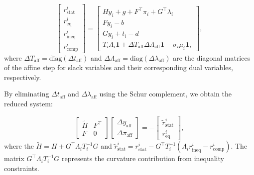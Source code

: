 \documentclass[conference]{IEEEtran}
\begin{document}
\begin{equation}
        \begin{bmatrix}
		r_{\mathrm{stat}}^i \\
		r_{\mathrm{eq}}^i \\
		r_{\mathrm{ineq}}^i \\
		r_{\mathrm{comp}}^i
		\end{bmatrix}
        =
		\begin{bmatrix}
            Hy_i + g + F^\top \pi_i + G^\top \lambda_i \\
            Fy_i - b \\
            Gy_i + t_i - d \\
            T_i \Lambda_i \mathbf{1} + \Delta T_\text{aff} \Delta \Lambda_\text{aff} \mathbf{1}  - \sigma_i \mu_i \mathbf{1},
        \end{bmatrix},
\end{equation}
where $\Delta T_\text{aff} = \mathrm{diag}(\Delta t_\text{aff})$ and $\Delta \Lambda_\text{aff} = \mathrm{diag}(\Delta \lambda_\text{aff})$ are the diagonal matrices of the affine step for slack variables and their corresponding dual variables, respectively.


By eliminating $\Delta t_\text{aff}$ and $\Delta \lambda_\text{aff}$ using the Schur complement, we obtain the reduced system:

\begin{equation}
    \begin{bmatrix}
    \tilde{H} & F^\top \\
    F & 0
    \end{bmatrix}
    \begin{bmatrix}
    \Delta y_\text{aff} \\
    \Delta \pi_\text{aff}
    \end{bmatrix} = -
    \begin{bmatrix}
    \tilde{r}_{\mathrm{stat}}^i \\
    r_{\mathrm{eq}}^i
    \end{bmatrix},
\end{equation}
where the $\tilde{H} = H + G^\top \Lambda_i T_i^{-1} G$ and $\tilde{r}_{\mathrm{stat}}^i = r_{\mathrm{stat}}^i - G^\top T_i^{-1} ( \Lambda_i r_{\mathrm{ineq}}^i - r_{\mathrm{comp}}^i )$.
The matrix $G^\top \Lambda_i T_i^{-1} G$ represents the curvature contribution from inequality constraints.
\end{document}
